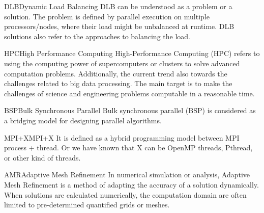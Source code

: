 

{DLB}{Dynamic Load Balancing}{
	DLB can be understood as a problem or a solution. The problem is defined by parallel execution on multiple processors/nodes, where their load might be unbalanced at runtime. DLB solutions also refer to the approaches to balancing the load.
}

{HPC}{High Performance Computing}{
	High-Performance Computing (HPC) refers to using the computing power of supercomputers or clusters to solve advanced computation problems. Additionally, the current trend also towards the challenges related to big data processing. The main target is to make the challenges of science and engineering problems computable in a reasonable time.
}


{BSP}{Bulk Synchronous Parallel}{
	Bulk synchronous parallel (BSP) is considered as a bridging model for designing parallel algorithms.
}

{MPI+X}{MPI+X}{
	It is defined as a hybrid programming model between MPI process + thread. Or we have known that X can be OpenMP threads, Pthread, or other kind of threads.
}

{AMR}{Adaptive Mesh Refinement}{
	In numerical simulation or analysis, Adaptive Mesh Refinement is a method of adapting the accuracy of a solution dynamically. When solutions are calculated numerically, the computation domain are often limited to pre-determined quantified grids or meshes.
}

